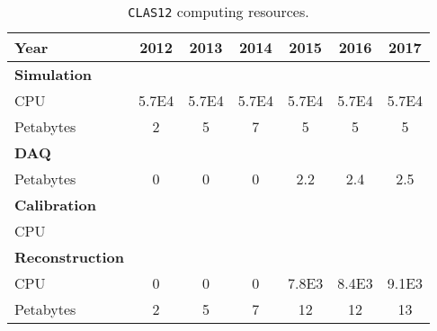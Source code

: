 \begin{table}[htdp]
\begin{center}
\begin{tabular}{|l|c|c|c|c|c|c|}
\hline 
{\bf Year}  & 2012 & 2013 & 2014 & 2015 & 2016 & 2017  \\  \hline
{\bf Simulation} & & & & & & \\
CPU & 5.7E4 & 5.7E4 & 5.7E4 & 5.7E4 & 5.7E4 & 5.7E4 \\
Petabytes & 2 & 5 & 7 & 5 & 5 & 5 \\ \hline
{\bf DAQ }& & & & & & \\
Petabytes & 0 & 0 & 0  & 2.2 & 2.4 & 2.5 \\ \hline
{\bf Calibration}  & & & & & & \\
CPU & & & & & & \\ \hline
{\bf Reconstruction} & & & & & & \\
CPU & 0 & 0 & 0 & 7.8E3 & 8.4E3 & 9.1E3 \\
Petabytes & 2 & 5 & 7 & 12 & 12 & 13 \\ \hline
\hline
\end{tabular}
\end{center}
\caption{\small{{\tt CLAS12} computing resources.}}
\label{tab:Compute}
\end{table}
